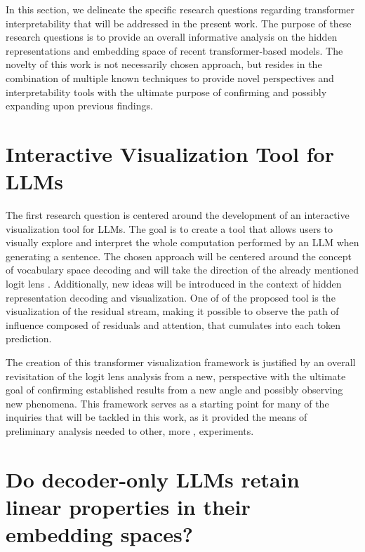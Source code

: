 In this section, we delineate the specific research questions regarding transformer interpretability that will be addressed in the present work.
The purpose of these research questions is to provide an overall informative analysis on the hidden representations and embedding space of recent transformer-based models.
The novelty of this work is not necessarily  chosen approach, but resides in the combination of multiple known techniques to provide novel perspectives and interpretability tools with the ultimate purpose of confirming and possibly expanding upon previous findings.

\section{Interactive Visualization Tool for LLMs}

The first research question is centered around the development of an interactive visualization tool for LLMs.
The goal is to create a tool that allows users to visually explore and interpret the whole computation performed by an LLM when generating a sentence.
The chosen approach will be centered around the concept of vocabulary space decoding and will take the direction of the already mentioned logit lens .
Additionally, new ideas will be introduced in the context of hidden representation decoding and visualization.
One of  of the proposed tool is the visualization of the residual stream, making it possible to observe the path of influence composed of residuals and attention, that cumulates into each token prediction.

The creation of this transformer visualization framework is justified by an overall revisitation of the logit lens analysis from a new,  perspective with the ultimate goal of confirming established results from a new angle and possibly observing new phenomena.
This framework serves as a starting point for many of the inquiries that will be tackled in this work, as it provided the means of preliminary analysis needed to  other, more , experiments.

\section{Do decoder-only LLMs retain linear properties in their embedding spaces?}

